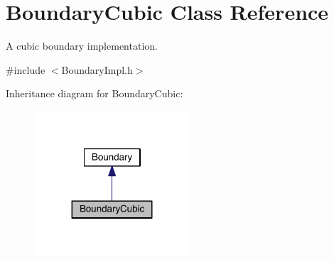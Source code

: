 \hypertarget{classBoundaryCubic}{\section{Boundary\+Cubic Class Reference}
\label{classBoundaryCubic}
}


A cubic boundary implementation.  




{\ttfamily \#include $<$Boundary\+Impl.\+h$>$}



Inheritance diagram for Boundary\+Cubic\+:\nopagebreak
\begin{figure}[H]
\begin{center}
\leavevmode
\includegraphics[width=164pt]{classBoundaryCubic__inherit__graph}
\end{center}
\end{figure}


